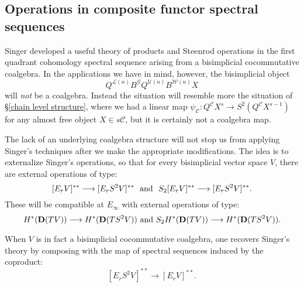 \documentclass[11pt]{amsart} \renewcommand{\baselinestretch}{1.4}
\theoremstyle{plain}
\theoremstyle{definition}
\renewcommand{\to}{\longrightarrow}
\newcommand{\scrG}{\mathscr{G}}
\newcommand{\calU}{\mathcal{U}}
\newcommand{\calL}{\mathcal{L}}
\newcommand{\calw}{\mathcal{W}}
\newcommand{\calc}{\mathcal{C}}
\newcommand{\BSW}{{\scrG}}
\newcommand{\BSWres}{B^\BSW}%
\newcommand{\Edown}[4]{[E_{#1}#2]^{#3}_{#4}}
\newcommand{\dual}{\mathbf{D}}
\begin{document}
\begin{Operations in composite functor spectral sequences}
\section{\textbf{Operations in composite functor spectral sequences}}
\label{Operations in composite functor spectral sequences}
Singer \cite{MR2245560} developed a useful theory of products and Steenrod operations in the first quadrant cohomology spectral sequence arising from a bisimplicial cocommutative coalgebra. In the applications we have in mind, however, the bisimplicial object \[Q^{\calL(n)}\BSWres Q^{\calU(n)}{ B^{\calw(n)}X}\] 
will \emph{not} be a coalgebra. Instead the situation will resemble more the situation of \S\ref{chain level structure}, where we had a linear map $\psi_\calc:Q^{\calc}X^s\to S^2(Q^{\calc}X^{s-1})$ for any almost free object $X\in s\calc$, but it is certainly not a coalgebra map.

The lack of an underlying coalgebra structure will not stop us from applying Singer's techniques after we make the appropriate modifications. The idea is to externalize Singer's operations, so that for every bisimplicial vector space $V$, there are  external operations of type:
\[\Edown{r}{V}{**}{}\to \Edown{r}{S^2V}{**}{}\textup{ \ and \ }S_2\Edown{r}{V}{**}{}\to \Edown{r}{S^2V}{**}{}.\]
These will be compatible at $E_\infty$ with external operations of type:
\[H^*(\dual(TV))\to H^*(\dual(TS^2V))\textup{ and }S_2H^*(\dual(TV))\to H^*(\dual(TS^2V)).\]


When $V$ is  in fact a bisimplicial cocommutative coalgebra, one recovers Singer's theory by composing with the map of spectral sequences induced by the coproduct:
\[\Edown{r}{S^2V}{**}{}\to \Edown{r}{V}{**}{}.\]

\end{Operations in composite functor spectral sequences}
\end{document}

